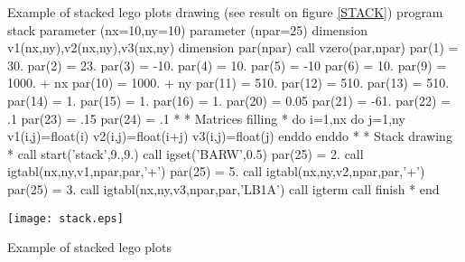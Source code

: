 \begin{XMPt}{Example of stacked lego plots drawing (see result on figure 
\ref{STACK})}
      program stack 
      parameter (nx=10,ny=10)
      parameter (npar=25)
      dimension v1(nx,ny),v2(nx,ny),v3(nx,ny)
      dimension par(npar)
      call vzero(par,npar)
      par(1)  = 30.
      par(2)  = 23.
      par(3)  = -10.
      par(4)  = 10.
      par(5)  = -10
      par(6)  = 10.
      par(9)  = 1000. + nx
      par(10) = 1000. + ny
      par(11) = 510.
      par(12) = 510.
      par(13) = 510.
      par(14) = 1.
      par(15) = 1.
      par(16) = 1.
      par(20) = 0.05
      par(21) = -61.
      par(22) = .1
      par(23) = .15
      par(24) = .1
*
*              Matrices filling
*
      do i=1,nx
         do j=1,ny
            v1(i,j)=float(i)
            v2(i,j)=float(i+j)
            v3(i,j)=float(j)
         enddo
      enddo
*
*              Stack drawing
*
      call start('stack',9.,9.)
      call igset('BARW',0.5)
      par(25) = 2.
      call igtabl(nx,ny,v1,npar,par,'+')
      par(25) = 5.
      call igtabl(nx,ny,v2,npar,par,'+')
      par(25) = 3.
      call igtabl(nx,ny,v3,npar,par,'LB1A')
      call igterm
      call finish
*
      end
\end{XMPt}

\begin{Fighere}
\begin{center}
\texttt{[image: stack.eps]}
\end{center}
\caption{Example of stacked lego plots}
\label{STACK}
\end{Fighere}

\clearpage
\mbox{}
\clearpage

